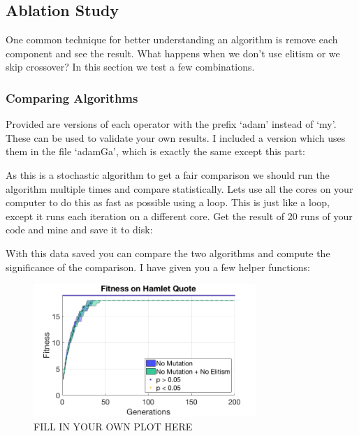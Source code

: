 \documentclass{article}
\begin{document}
\subsection{Ablation Study}
One common technique for better understanding an algorithm is remove each component and see the result. What happens when we don't use elitism or we skip crossover? In this section we test a few combinations. 

\subsubsection{Comparing Algorithms}
Provided are versions of each operator with the prefix `adam' instead of `my'. These can be used to validate your own results. I included a version which uses them in the file `adamGa', which is exactly the same except this part:

	

As this is a stochastic algorithm to get a fair comparison we should run the algorithm multiple times and compare statistically. Lets use all the cores on your computer to do this as fast as possible using a  loop. This is just like a  loop, except it runs each iteration on a different core. Get the result of 20 runs of your code and mine and save it to disk:

	

With this data saved you can compare the two algorithms and compute the significance of the comparison. I have given you a few helper functions:

	

	\begin{figure}[h!]
	\begin{center}
	\includegraphics[width=0.75\textwidth]{img/1_vsStandard.png}
	\caption{\color{red}FILL IN YOUR OWN PLOT HERE}
	\end{center}
	\end{figure}
	
\end{document}
